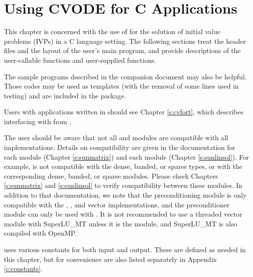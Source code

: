 \chapter{Using CVODE for C Applications}\label{s:simulation}

This chapter is concerned with the use of {\cvode} for the solution of
initial value problems (IVPs) in a C language setting.  The following
sections treat the header files and the layout of the user's main
program, and provide descriptions of the {\cvode} user-callable
functions and user-supplied functions.

The sample programs described in the companion document \cite{cvode_ex}
may also be helpful.  Those codes may be used as templates (with the removal
of some lines used in testing) and are included in the {\cvode} package.

Users with applications written in {\F} should see Chapter \ref{s:cvfort},
which describes interfacing with {\cvode} from {\F}.

The user should be aware that not all {\sunlinsol} and {\sunmatrix}
modules are compatible with all {\nvector} implementations.
Details on compatibility are given in the documentation for each
{\sunmatrix} module (Chapter \ref{s:sunmatrix}) and each {\sunlinsol}
module (Chapter \ref{s:sunlinsol}). For example, {\nvecp} is not
compatible with the dense, banded, or sparse {\sunmatrix} types, or with
the corresponding dense, banded, or sparse {\sunlinsol} modules.  Please
check Chapters \ref{s:sunmatrix} and \ref{s:sunlinsol} to verify
compatibility between these modules.  In addition to that
documentation, we note that the {\cvbandpre} preconditioning module is
only compatible with the {\nvecs}, {\nvecopenmp}, and {\nvecpthreads}
vector implementations, and the preconditioner module {\cvbbdpre}
can only be used with {\nvecp}.
It is not recommended to use a threaded vector module with SuperLU\_MT
unless it is the {\nvecopenmp} module, and SuperLU\_MT is also compiled
with OpenMP.

{\cvode} uses various constants for both input and output.  These are
defined as needed in this chapter, but for convenience are also listed
separately in Appendix \ref{c:constants}.

